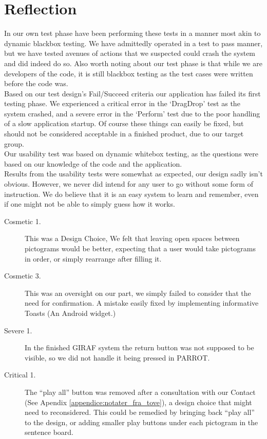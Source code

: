 \section{Reflection}
In our own test phase have been performing these tests in a manner most akin to dynamic blackbox testing.
We have admittedly operated in a test to pass manner, but we have tested avenues of actions that we suspected could crash the system and did indeed do so.
Also worth noting about our test phase is that while we are developers of the code, it is still blackbox testing as the test cases were written before the code was.\\
Based on our test design's Fail/Succeed criteria our application has failed its first testing phase.
We experienced a critical error in the `DragDrop' test as the system crashed, and a severe error in the `Perform' test due to the poor handling of a slow application startup.
Of course these things can easily be fixed, but should not be considered acceptable in a finished product, due to our target group.\\

Our usability test was based on dynamic whitebox testing, as the questions were based on our knowledge of the code and the application.\\
Results from the usability tests were somewhat as expected, our design sadly isn't obvious.
However, we never did intend for any user to go without some form of instruction.
We do believe that it is an easy system to learn and remember, even if one might not be able to simply guess how it works.\\

\begin{description}
	\item[Cosmetic 1.] This was a Design Choice, We felt that leaving open spaces between pictograms would be better, expecting that a user would take pictograms in order, or simply rearrange after filling it.
	\item[Cosmetic 3.] This was an oversight on our part, we simply failed to consider that the need for confirmation. A mistake easily fixed by implementing informative Toasts (An Android widget.)
	\item[Severe 1.] In the finished GIRAF system the return button was not supposed to be visible, so we did not handle it being pressed in PARROT.
	\item[Critical 1.] The ``play all'' button was removed after a consultation with our Contact (See Apendix \ref{appendice:notater_fra_tove}), a design choice that might need to reconsidered. This could be remedied by bringing back ``play all'' to the design, or adding smaller play buttons under each pictogram in the sentence board.  
\end{description}


